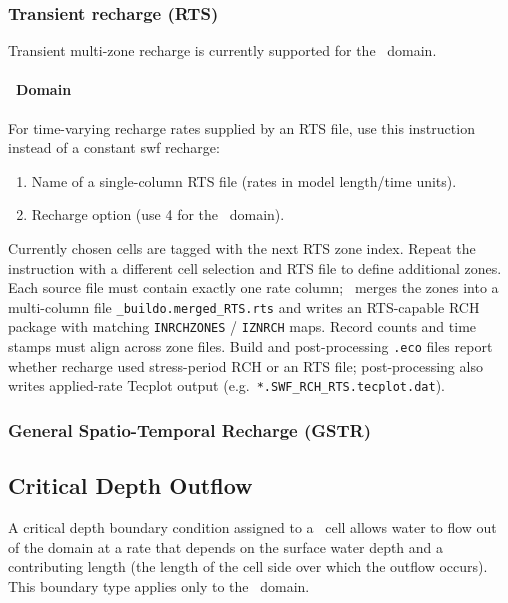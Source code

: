 \subsubsection{Transient recharge (\textsf{RTS})}
Transient multi-zone recharge is currently supported for the \swf\ domain.

\paragraph*{\swf\ Domain}
For time-varying recharge rates supplied by an RTS file, use this instruction instead of a constant {\sf swf recharge}:

    {
        \squish
        \begin{enumerate}
            \item {} Name of a single-column RTS file (rates in model length/time units).
            \item {} Recharge option (use 4 for the \swf\ domain).
        \end{enumerate}
        Currently chosen cells are tagged with the next RTS zone index.
        Repeat the instruction with a different cell selection and RTS file to define additional zones.
        Each source file must contain exactly one rate column; \mut\ merges the zones into a multi-column file \texttt{\_buildo.merged\_RTS.rts} and writes an RTS-capable RCH package with matching \texttt{INRCHZONES} / \texttt{IZNRCH} maps.
        Record counts and time stamps must align across zone files.
        Build and post-processing \texttt{.eco} files report whether recharge used stress-period \textsf{RCH} or an RTS file; post-processing also writes applied-rate Tecplot output (e.g.\ \texttt{*.SWF\_RCH\_RTS.tecplot.dat}).
    }

\subsubsection{General Spatio-Temporal Recharge (\textsf{GSTR})}
\label{section:GSTR}


\subsection{Critical Depth Outflow}
A critical depth boundary condition assigned to a \swf\ cell allows water to flow out of the domain at a rate that depends on the surface water depth and a contributing length (the length of the cell side over which the outflow occurs).
This boundary type applies only to the \swf\ domain.

